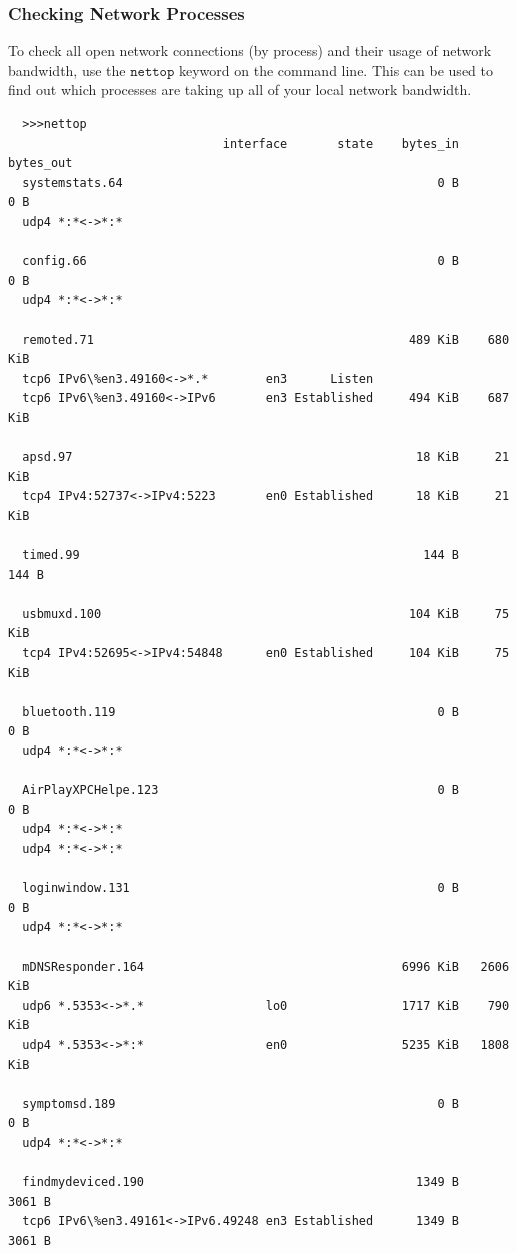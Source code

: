 \documentclass{article}
\begin{document}
  \subsubsection{Checking Network Processes}
  To check all open network connections (by process) and their usage of network bandwidth, use the $\texttt{nettop}$ keyword on the command line. This can be used to find out which processes are taking up all of your local network bandwidth. 
  \begin{lstlisting}
  >>>nettop 
                              interface       state    bytes_in  bytes_out
  systemstats.64                                            0 B        0 B
  udp4 *:*<->*:*

  config.66                                                 0 B        0 B
  udp4 *:*<->*:*

  remoted.71                                            489 KiB    680 KiB 
  tcp6 IPv6\%en3.49160<->*.*        en3      Listen      
  tcp6 IPv6\%en3.49160<->IPv6       en3 Established     494 KiB    687 KiB

  apsd.97                                                18 KiB     21 KiB
  tcp4 IPv4:52737<->IPv4:5223       en0 Established      18 KiB     21 KiB

  timed.99                                                144 B      144 B

  usbmuxd.100                                           104 KiB     75 KiB
  tcp4 IPv4:52695<->IPv4:54848      en0 Established     104 KiB     75 KiB
   
  bluetooth.119                                             0 B        0 B
  udp4 *:*<->*:*

  AirPlayXPCHelpe.123                                       0 B        0 B
  udp4 *:*<->*:*
  udp4 *:*<->*:*

  loginwindow.131                                           0 B        0 B
  udp4 *:*<->*:*

  mDNSResponder.164                                    6996 KiB   2606 KiB
  udp6 *.5353<->*.*                 lo0                1717 KiB    790 KiB
  udp4 *.5353<->*:*                 en0                5235 KiB   1808 KiB

  symptomsd.189                                             0 B        0 B
  udp4 *:*<->*:*

  findmydeviced.190                                      1349 B     3061 B
  tcp6 IPv6\%en3.49161<->IPv6.49248 en3 Established      1349 B     3061 B


\end{lstlisting}
\end{document}
